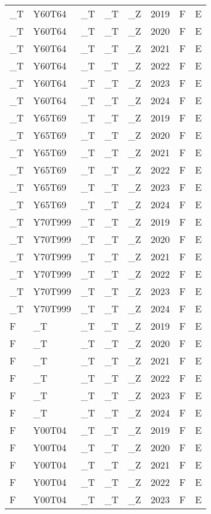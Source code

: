 \begin{longtable}[t]{llllllll}
\_T & Y60T64 & \_T & \_T & \_Z & 2019 & F & E\\
\_T & Y60T64 & \_T & \_T & \_Z & 2020 & F & E\\
\addlinespace
\_T & Y60T64 & \_T & \_T & \_Z & 2021 & F & E\\
\_T & Y60T64 & \_T & \_T & \_Z & 2022 & F & E\\
\_T & Y60T64 & \_T & \_T & \_Z & 2023 & F & E\\
\_T & Y60T64 & \_T & \_T & \_Z & 2024 & F & E\\
\_T & Y65T69 & \_T & \_T & \_Z & 2019 & F & E\\
\addlinespace
\_T & Y65T69 & \_T & \_T & \_Z & 2020 & F & E\\
\_T & Y65T69 & \_T & \_T & \_Z & 2021 & F & E\\
\_T & Y65T69 & \_T & \_T & \_Z & 2022 & F & E\\
\_T & Y65T69 & \_T & \_T & \_Z & 2023 & F & E\\
\_T & Y65T69 & \_T & \_T & \_Z & 2024 & F & E\\
\addlinespace
\_T & Y70T999 & \_T & \_T & \_Z & 2019 & F & E\\
\_T & Y70T999 & \_T & \_T & \_Z & 2020 & F & E\\
\_T & Y70T999 & \_T & \_T & \_Z & 2021 & F & E\\
\_T & Y70T999 & \_T & \_T & \_Z & 2022 & F & E\\
\_T & Y70T999 & \_T & \_T & \_Z & 2023 & F & E\\
\addlinespace
\_T & Y70T999 & \_T & \_T & \_Z & 2024 & F & E\\
F & \_T & \_T & \_T & \_Z & 2019 & F & E\\
F & \_T & \_T & \_T & \_Z & 2020 & F & E\\
F & \_T & \_T & \_T & \_Z & 2021 & F & E\\
F & \_T & \_T & \_T & \_Z & 2022 & F & E\\
\addlinespace
F & \_T & \_T & \_T & \_Z & 2023 & F & E\\
F & \_T & \_T & \_T & \_Z & 2024 & F & E\\
F & Y00T04 & \_T & \_T & \_Z & 2019 & F & E\\
F & Y00T04 & \_T & \_T & \_Z & 2020 & F & E\\
F & Y00T04 & \_T & \_T & \_Z & 2021 & F & E\\
\addlinespace
F & Y00T04 & \_T & \_T & \_Z & 2022 & F & E\\
F & Y00T04 & \_T & \_T & \_Z & 2023 & F & E\\

\end{longtable}
